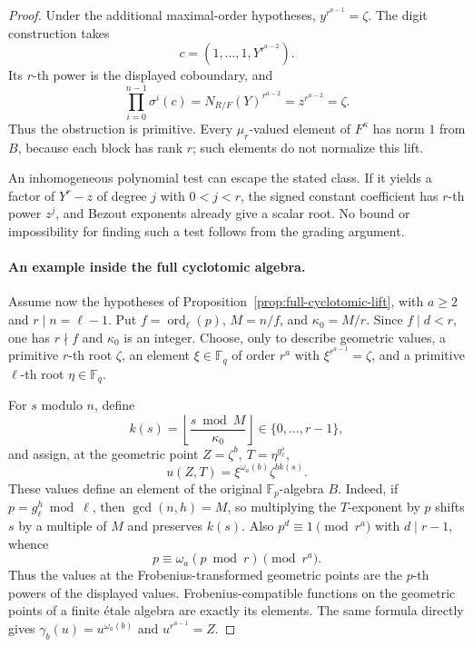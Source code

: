 \documentclass[11pt]{article}
\theoremstyle{definition}
\theoremstyle{remark}
\begin{document}
\begin{proof}
Under the additional maximal-order hypotheses,
\(y^{r^{a-1}}=\zeta\).
The digit construction takes
\[
                         c=(1,\ldots,1,Y^{r^{a-2}}).
\]
Its \(r\)-th power is the displayed coboundary, and
\[
          \prod_{i=0}^{n-1}\sigma^i(c)
              =N_{R/F}(Y)^{r^{a-2}}
              =z^{r^{a-2}}=\zeta.
\]
Thus the obstruction is primitive.
Every \(\mu_r\)-valued element of \(F^\kappa\) has norm \(1\)
from \(B\), because each block has rank \(r\); such elements
do not normalize this lift.

An inhomogeneous polynomial test can escape the stated class.
If it yields a factor of \(Y^r-z\) of degree \(j\) with
\(0<j<r\), the signed constant coefficient has \(r\)-th
power \(z^j\), and Bezout exponents already give a scalar root.
No bound or impossibility for finding such a test follows
from the grading argument.

\paragraph{An example inside the full cyclotomic algebra.}
Assume now the hypotheses of
Proposition~\ref{prop:full-cyclotomic-lift}, with \(a\geq2\)
and \(r\mid n=\ell-1\).
Put \(f=\operatorname{ord}_\ell(p)\),
\(M=n/f\), and \(\kappa_0=M/r\).
Since \(f\mid d<r\), one has \(r\nmid f\) and
\(\kappa_0\) is an integer.
Choose, only to describe geometric values, a primitive
\(r\)-th root \(\zeta\), an element \(\xi\in\mathbb F_q\)
of order \(r^a\) with \(\xi^{r^{a-1}}=\zeta\), and
a primitive \(\ell\)-th root \(\eta\in\mathbb F_q\).

For \(s\) modulo \(n\), define
\[
 k(s)=\left\lfloor\frac{s\bmod M}{\kappa_0}\right\rfloor
                  \in\{0,\ldots,r-1\},
\]
and assign, at the geometric point
\(Z=\zeta^b,\ T=\eta^{g_\ell^s}\),
\[
                    u(Z,T)=
                        \xi^{\omega_a(b)}\zeta^{b k(s)}.
\]
These values define an element of the original
\(\mathbb F_p\)-algebra \(B\).
Indeed, if \(p=g_\ell^h\bmod\ell\), then
\(\gcd(n,h)=M\), so multiplying the \(T\)-exponent by \(p\)
shifts \(s\) by a multiple of \(M\) and preserves \(k(s)\).
Also \(p^d\equiv1\pmod{r^a}\) with \(d\mid r-1\), whence
\[
                         p\equiv\omega_a(p\bmod r)\pmod{r^a}.
\]
Thus the values at the Frobenius-transformed geometric points
are the \(p\)-th powers of the displayed values.
Frobenius-compatible functions on the geometric points of a
finite \'{e}tale algebra are exactly its elements.
The same formula directly gives
\(\gamma_b(u)=u^{\omega_a(b)}\) and
\(u^{r^{a-1}}=Z\).


\end{proof}
\end{document}
